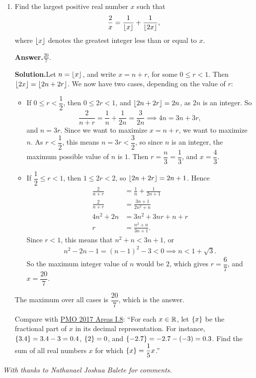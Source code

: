 \documentclass[11pt,paper=letter]{scrartcl}
\newcommand{\ans}{{\sffamily \bfseries Answer.}\;}
\newcommand{\sol}{{\sffamily \bfseries Solution.}\;}
\newenvironment{rem}%
{\noindent \ignorespaces \small \sffamily \sansmath {\bfseries Remark.}}%
{\ignorespacesafterend}
\begin{document}
\begin{enumerate}[left=0pt]
\item Find the largest positive real number $x$ such that \[
  \dfrac{2}{x} = \dfrac{1}{\left\lfloor x \right\rfloor} + \dfrac{1}{\left\lfloor 2x \right\rfloor},
\]
where $\left\lfloor x \right\rfloor$ denotes the greatest integer less than or equal to $x$.

\ans $\boxed{\frac{20}{7}}$.

\sol Let $n = \left\lfloor x \right\rfloor$, and write $x = n + r$, for some $0 \le r < 1$. Then $\left\lfloor 2x \right\rfloor = \left\lfloor 2n + 2r \right\rfloor$. We now have two cases, depending on the value of $r$:

\begin{itemize}
\item If $0 \le r < \dfrac{1}{2}$, then $0 \le 2r < 1$, and $\left\lfloor 2n + 2r \right\rfloor = 2n$, as $2n$ is an integer. So \[
\frac{2}{n + r} = \frac{1}{n} + \frac{1}{2n} = \frac{3}{2n} \implies 4n = 3n + 3r,
\]
and $n = 3r$. Since we want to maximize $x = n + r$, we want to maximize $n$. As $r < \dfrac{1}{2}$, this means $n = 3r < \dfrac{3}{2}$, so since $n$ is an integer, the maximum possible value of $n$ is $1$. Then $r = \dfrac{n}{3} = \dfrac{1}{3}$, and $x = \dfrac{4}{3}$.

\item If $\dfrac{1}{2} \le r < 1$, then $1 \le 2r < 2$, so $\left\lfloor 2n + 2r \right\rfloor = 2n + 1$. Hence
\begin{align*}
\frac{2}{n + r} &= \frac{1}{n} + \frac{1}{2n + 1} \\
\frac{2}{n + r} &= \frac{3n + 1}{2n^2 + n} \\
4n^2 + 2n &= 3n^2 + 3nr + n + r \\
r &= \frac{n^2 + n}{3n + 1}.
\end{align*}
Since $r < 1$, this means that $n^2 + n < 3n + 1$, or
\begin{align*}
n^2 - 2n - 1 = (n - 1)^2 - 3 < 0 \implies n < 1 + \sqrt{3}.
\end{align*}
So the maximum integer value of $n$ would be $2$, which gives $r = \dfrac{6}{7}$, and $x = \dfrac{20}{7}$.

\end{itemize}

The maximum over all cases is $\dfrac{20}{7}$, which is the answer.

\begin{rem}
Compare with \href{https://cjquines.com/files/pmo2017areas.pdf}{PMO 2017 Areas I.8}: ``For each $x \in \mathbb R$, let $\left\{ x \right\}$ be the fractional part of $x$ in its decimal representation. For instance, $\left\{ 3.4 \right\} = 3.4 -3 = 0.4$, $\left\{ 2 \right\} = 0$, and $\left\{ -2.7 \right\} = -2.7 - (-3) = 0.3$. Find the sum of all real numbers $x$ for which $\left\{ x \right\} = \dfrac{1}{5}x$.''
\end{rem}

\end{enumerate}

\emph{With thanks to Nathanael Joshua Balete for comments.}
\end{document}
